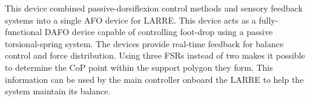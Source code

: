 This device combined passive-dorsiflexion control methods and sensory feedback systems into a single AFO device for LARRE. This device acts as a fully-functional DAFO device capable of controlling foot-drop using a passive torsional-spring system. The devices provide real-time feedback for balance control and force distribution. Using three FSRs instead of two makes it possible to determine the CoP point within the support polygon they form. This information can be used by the main controller onboard the LARRE to help the system maintain its balance.

